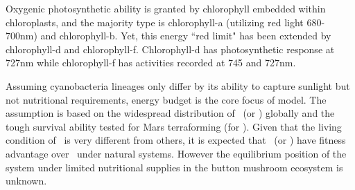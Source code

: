 \documentclass[../thesis.tex]{subfiles} %
\begin{document}
  Oxygenic photosynthetic ability is granted by chlorophyll embedded within chloroplasts, and the majority type is chlorophyll-a (utilizing red light 680-700nm) and chlorophyll-b.  Yet, this energy ``red limit" has been extended by chlorophyll-d and chlorophyll-f.  Chlorophyll-d has photosynthetic response at 727nm while chlorophyll-f has activities recorded at 745 and 727nm.
  
  Assuming cyanobacteria lineages only differ by its ability to capture sunlight but not nutritional requirements,\autocite{giraldo2014plant} energy budget is the core focus of model.  The assumption is based on the widespread distribution of \As\ (or \Ss) globally\autocite{joshi2018bacterial,sawa2017electricity} and the tough survival ability tested for Mars terraforming (for \Cs).\autocite{baque2013boss}  Given that the living condition of \Ct\ is very different from others,\autocite{nurnberg2018photochemistry} it is expected that \As\ (or \Ss) have fitness advantage over \Cs\ under natural systems.  However the equilibrium position of the system under limited nutritional supplies in the button mushroom ecosystem\autocite{joshi2018bacterial} is unknown.
\end{document}
